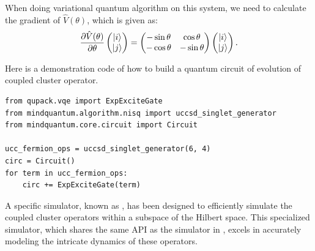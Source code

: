 When doing variational quantum algorithm on this system, we need to calculate the gradient of $\hat{V}(\theta)$, which is given as:
\begin{equation}
    \frac{\partial \hat{V}(\theta)}{\partial\theta}\begin{pmatrix}
        \ket{i} \\\ket{j}
    \end{pmatrix}=\begin{pmatrix}
        -\sin\theta & \cos\theta  \\
        -\cos\theta & -\sin\theta
    \end{pmatrix}\begin{pmatrix}
        \ket{i} \\\ket{j}
    \end{pmatrix}.
\end{equation}

Here is a demonstration code of how to build a quantum circuit of evolution of coupled cluster operator.

\begin{lstlisting}
from qupack.vqe import ExpExciteGate
from mindquantum.algorithm.nisq import uccsd_singlet_generator
from mindquantum.core.circuit import Circuit

ucc_fermion_ops = uccsd_singlet_generator(6, 4)
circ = Circuit()
for term in ucc_fermion_ops:
    circ += ExpExciteGate(term)
\end{lstlisting}

A specific simulator, known as , has been designed to efficiently simulate the coupled cluster operators within a subspace of the Hilbert space. This specialized simulator, which shares the same API as the simulator in \MindQuantum, excels in accurately modeling the intricate dynamics of these operators.
